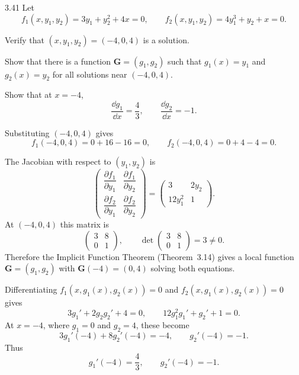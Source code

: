 \documentclass[11pt,oneside]{article}
\begin{document}
\begin{problem}{3.41}
Let
\[
    f_1(x,y_1,y_2)=3y_1+y_2^2+4x=0,
    \qquad
    f_2(x,y_1,y_2)=4y_1^3+y_2+x=0.
\]
\begin{problemsubparts}
    \item Verify that $(x,y_1,y_2)=(-4,0,4)$ is a solution.
    \item Show that there is a function $\mathbf G=(g_1,g_2)$ such that $g_1(x)=y_1$ and $g_2(x)=y_2$ for all solutions near $(-4,0,4)$.
    \item Show that at $x=-4$,
    \[
        \frac{\dd g_1}{\dd x}=\frac43,
        \qquad
        \frac{\dd g_2}{\dd x}=-1.
    \]
\end{problemsubparts}
\end{problem}

\begin{solution}
\begin{problemsubparts}
    \item Substituting $(-4,0,4)$ gives
    \[
        f_1(-4,0,4)=0+16-16=0,
        \qquad
        f_2(-4,0,4)=0+4-4=0.
    \]

    \item The Jacobian with respect to $(y_1,y_2)$ is
    \[
        \begin{pmatrix}
            \dfrac{\partial f_1}{\partial y_1}&\dfrac{\partial f_1}{\partial y_2}\\[0.4em]
            \dfrac{\partial f_2}{\partial y_1}&\dfrac{\partial f_2}{\partial y_2}
        \end{pmatrix}
        =\begin{pmatrix}3&2y_2\\12y_1^2&1\end{pmatrix}.
    \]
    At $(-4,0,4)$ this matrix is
    \[
        \begin{pmatrix}3&8\\0&1\end{pmatrix},
        \qquad
        \det\begin{pmatrix}3&8\\0&1\end{pmatrix}=3\neq0.
    \]
    Therefore the Implicit Function Theorem (Theorem~3.14) gives a local function $\mathbf G=(g_1,g_2)$ with $\mathbf G(-4)=(0,4)$ solving both equations.

    \item Differentiating $f_1(x,g_1(x),g_2(x))=0$ and $f_2(x,g_1(x),g_2(x))=0$ gives
    \[
        3g_1'+2g_2g_2'+4=0,
        \qquad
        12g_1^2g_1'+g_2'+1=0.
    \]
    At $x=-4$, where $g_1=0$ and $g_2=4$, these become
    \[
        3g_1'(-4)+8g_2'(-4)=-4,
        \qquad
        g_2'(-4)=-1.
    \]
    Thus
    \[
        \boxed{g_1'(-4)=\frac43,\qquad g_2'(-4)=-1}.
    \]
\end{problemsubparts}
\end{solution}
\end{document}

